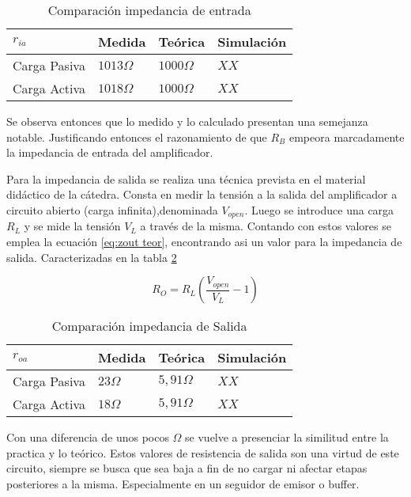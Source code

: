 \begin{table}[ht]
    \centering
    \begin{tabular}{|l|l|l|l|}
    \hline
    $r_{ia}$     & Medida       & Teórica         & Simulación \\ \hline
    Carga Pasiva & $1013\Omega$ & $1000\Omega $   &  $XX $          \\ \hline
    Carga Activa & $1018\Omega$ & $1000\Omega $  &  $XX $          \\ \hline
    \end{tabular}
    \caption{Comparación impedancia de entrada}\label{table:Ri comp}
\end{table}

Se observa entonces que lo medido y lo calculado presentan una semejanza notable. Justificando entonces el razonamiento de que $R_B$ empeora marcadamente la impedancia de entrada del amplificador.

Para la impedancia de salida se realiza una técnica prevista en el material didáctico de la cátedra. Consta en medir la tensión a la salida del amplificador a circuito abierto (carga infinita),denominada $V_{open}$. Luego se introduce una carga $R_L$ y se mide la tensión $V_L$ a través de la misma.
Contando con estos valores se emplea la ecuación \ref{eq:zout teor}, encontrando asi un valor para la impedancia de salida. Caracterizadas en la tabla \ref{table:Ro comp}

\begin{equation}
    R_O = R_L(\frac{V_{open}}{V_L}-1)
    \label{eq:zout teor}
\end{equation}

\begin{table}[ht]
    \centering
    \begin{tabular}{|l|l|l|l|}
    \hline
    $r_{oa}$     & Medida     & Teórica         & Simulación \\ \hline
    Carga Pasiva & $23\Omega$ & $5,91\Omega $   &  $XX $          \\ \hline
    Carga Activa & $18\Omega$ &  $5,91\Omega $  &  $XX $          \\ \hline
    \end{tabular}
    \caption{Comparación impedancia de Salida}\label{table:Ro comp}
\end{table}

Con una diferencia de unos pocos $\Omega$ se vuelve a presenciar la similitud entre la practica y lo teórico. Estos valores de resistencia de salida son una virtud de este circuito, siempre se busca que sea baja a fin de no cargar ni afectar etapas posteriores a la misma. Especialmente en un seguidor de emisor o buffer.

